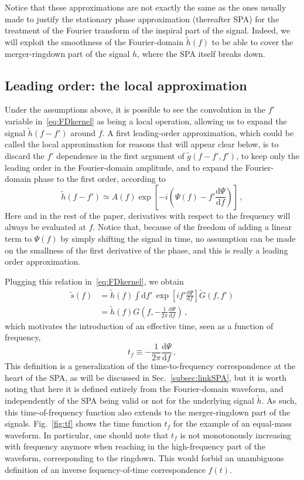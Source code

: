 \documentclass[aps,showpacs,%
prd,superscriptaddress,nofootinbib]{revtex4}
\newcommand{\be}{\begin{equation}}
\newcommand{\ee}{\end{equation}}
\newcommand\ud{{\mathrm{d}}}
\newcommand{\nn}{\nonumber}
\newcommand{\tf}{t_{f}}
\begin{document}
Notice that these approximations are not exactly the same as the ones usually made to justify the stationary phase approximation (thereafter SPA) for the treatment of the Fourier transform of the inspiral part of the signal. Indeed, we will exploit the smoothness of the Fourier-domain $\tilde{h}(f)$ to be able to cover the merger-ringdown part of the signal $h$, where the SPA itself breaks down.


\subsection{Leading order: the local approximation}
\label{subsec:LLP}

Under the assumptions above, it is possible to see the convolution in the $f'$ variable in~\eqref{eq:FDkernel} as being a local operation, allowing us to expand the signal $\tilde{h}(f-f')$ around $f$. A first leading-order approximation, which could be called the local approximation for reasons that will appear clear below, is to discard the $f'$ dependence in the first argument of $\tilde{g}(f-f', f')$, to keep only the leading order in the Fourier-domain amplitude, and to expand the Fourier-domain phase to the first order, according to
\be
	\tilde{h}(f-f') \simeq A(f) \exp\left[ -i\left( \Psi(f) - f' \frac{\ud \Psi}{\ud f} \right) \right] \,,
\ee
Here and in the rest of the paper, derivatives with respect to the frequency will always be evaluated at $f$. Notice that, because of the freedom of adding a linear term to $\Psi(f)$ by simply shifting the signal in time, no assumption can be made on the smallness of the first derivative of the phase, and this is really a leading order approximation.

Plugging this relation in~\eqref{eq:FDkernel}, we obtain
\begin{align}
	\tilde{s}(f) &= \tilde{h}(f) \int \ud f' \, \exp\left[ i f' \frac{\ud \Psi}{\ud f} \right] \tilde{G}(f,f') \nn\\
	&= \tilde{h}(f) G\left( f, -\frac{1}{2\pi} \frac{\ud \Psi}{\ud f} \right) \,,
\end{align}
which motivates the introduction of an effective time, seen as a function of frequency,
\be\label{eq:deftf}
	\tf \equiv -\frac{1}{2\pi} \frac{\ud \Psi}{\ud f} \,,
\ee
This definition is a generalization of the time-to-frequency correspondence at the heart of the SPA, as will be discussed in Sec.~\ref{subsec:linkSPA}, but it is worth noting that here it is defined entirely from the Fourier-domain waveform, and independently of the SPA being valid or not for the underlying signal $\tilde{h}$. As such, this time-of-frequency function also extends to the merger-ringdown part of the signals. Fig.~\ref{fig:tf} shows the time function $\tf$ for the example of an equal-mass waveform. In particular, one should note that $\tf$ is not monotonously increasing with frequency anymore when reaching in the high-frequency part of the waveform, corresponding to the ringdown. This would forbid an unambiguous definition of an inverse fequency-of-time correspondence $f(t)$. 
\end{document}
